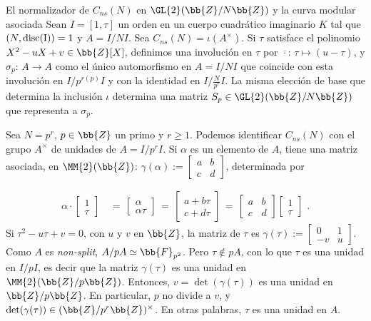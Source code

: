 \begin{subsection}{El normalizador de $C_{ns}(N)$ en $\GL{2}(\bb{Z}/N\bb{Z})$%
			y la curva modular asociada}
Sean $I=[1,\tau]$ un orden en un cuerpo cuadr\'{a}tico imaginario $K$ tal que
$(N,\rm{disc}(I))=1$ y $A=I/NI$. Sea $C_{ns}(N)=\iota(A^{\times})$. Si $\tau$
satisface el polinomio $X^{2}-uX+v\in\bb{Z}[X]$, definimos una involuci\'{o}n
en $\tau$ por $\overline{\cdot}:\,\tau\mapsto(u-\tau)$, y
$\sigma_{p}:\,A\rightarrow A$ como el \'{u}nico automorfismo en $A=I/NI$ que
coincide con esta involuci\'{o}n en $I/p^{r(p)}I$ y con la identidad en
$I/\frac{N}{p^{r}}I$. La misma elecci\'{o}n de base que determina la
inclusi\'{o}n $\iota$ determina una matriz $S_{p}\in\GL{2}(\bb{Z}/N\bb{Z})$
que representa a $\sigma_{p}$.

Sea $N=p^{r}$, $p\in\bb{Z}$ un primo y $r\geq 1$. Podemos identificar $C_{ns}(N)$
con el grupo $A^{\times}$ de unidades de $A=I/p^{r}I$. Si $\alpha$ es un elemento
de $A$, tiene una matriz asociada, en $\MM{2}(\bb{Z})$:
\begin{math}
 \gamma(\alpha):=
 \left[\begin{smallmatrix}a&b\\c&d\end{smallmatrix}\right]
\end{math},
determinada por

\begin{align*}
 \alpha\cdot\begin{bmatrix} 1\\ \tau \end{bmatrix} & \,=\,
 \begin{bmatrix} \alpha\\ \alpha\tau \end{bmatrix} \,=\,
 \begin{bmatrix} a+b\tau\\ c+d\tau \end{bmatrix} \,=\,
 \begin{bmatrix} a&b\\c&d \end{bmatrix}
 \begin{bmatrix} 1\\ \tau \end{bmatrix}\text{ .}
\end{align*}
Si $\tau^{2}-u\tau+v=0$, con $u$ y $v$ en $\bb{Z}$, la matriz de $\tau$ es
\begin{math}
 \gamma(\tau):=
 \left[\begin{smallmatrix}0&1\\-v&u\end{smallmatrix}\right]
\end{math}.
Como $A$ es \textit{non-split}, $A/pA\simeq\bb{F}_{p^{2}}$. Pero $\tau\not\in pA$,
con lo que $\tau$ es una unidad en $I/pI$, es decir que la matriz $\gamma(\tau)$
es una unidad en $\MM{2}(\bb{Z}/p\bb{Z})$. Entonces, $v=\det(\gamma(\tau))$
es una unidad en $\bb{Z}/p\bb{Z}$. En particular, $p$ no divide a $v$, y
$\det(\gamma(\tau))\in(\bb{Z}/p^{r}\bb{Z})^{\times}$. En otras palabras,
$\tau$ es una unidad en $A$.


\end{subsection}
